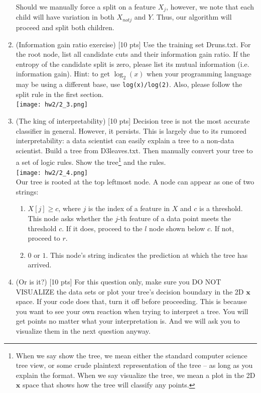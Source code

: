 \documentclass[a4paper]{article}
\theoremstyle{definition}
\def\x{\mathbf x}
\begin{document}
\begin{enumerate}
Should we manually force a split on a feature $X_j$, however, we note that each child will have variation in both $X_{not j}$ and $Y$. Thus, our algorithm will proceed and split both children.

\item (Information gain ratio exercise)  [10 pts] Use the training set Druns.txt.  For the root node, list all candidate cuts and their information gain ratio. If the entropy of the candidate split is zero, please list its mutual information (i.e. information gain). Hint: to get $\log_2(x)$ when your programming language may be using a different base, use \verb|log(x)/log(2)|. Also, please follow the split rule in the first section. \\

\texttt{[image: hw2/2\_3.png]}

\item (The king of interpretability)  [10 pts] Decision tree is not the most accurate classifier in general.  However, it persists.  This is largely due to its rumored interpretability: a data scientist can easily explain a tree to a non-data scientist.  Build a tree from D3leaves.txt.  Then manually convert your tree to a set of logic rules.  Show the tree\footnote{When we say show the tree, we mean either the standard computer science tree view, or some crude plaintext representation of the tree -- as long as you explain the format.  When we say visualize the tree, we mean a plot in the 2D $\x$ space that shows how the tree will classify any points.} and the rules. \\

\texttt{[image: hw2/2\_4.png]}\\
Our tree is rooted at the top leftmost node. A node can appear as one of two strings:
\begin{enumerate}
    \item $X[j] \geq c$, where $j$ is the index of a feature in $X$ and $c$ is a threshold. This node asks whether the $j$-th feature of a data point meets the threshold $c$. If it does, proceed to the $l$ node shown below $c$. If not, proceed to $r$.
    \item $0$ or $1$. This node's string indicates the prediction at which the tree has arrived.
\end{enumerate}

\item (Or is it?)  [10 pts] For this question only, make sure you DO NOT VISUALIZE the data sets or plot your tree's decision boundary in the 2D $\x$ space.  If your code does that, turn it off before proceeding.  This is because you want to see your own reaction when trying to interpret a tree.  You will get points no matter what your interpretation is.
And we will ask you to visualize them in the next question anyway.
  \begin{itemize}
  

\end{itemize}
\end{enumerate}
\end{document}
